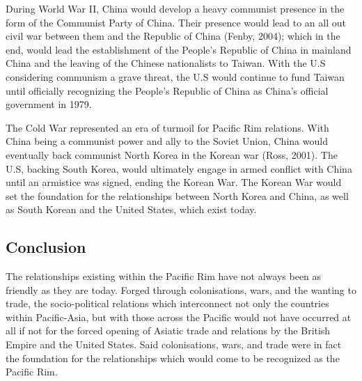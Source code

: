 \documentclass[man,donotrepeattitle,letter]{apa6}
\begin{document}
During World War II, China would develop a heavy communist presence in the form of the Communist Party of China.  Their presence would lead to an all out civil war between them and the Republic of China (Fenby, 2004); which in the end, would lead the establishment of the People's Republic of China in mainland China and the leaving of the Chinese nationalists to Taiwan. With the U.S considering communism a grave threat, the U.S would continue to fund Taiwan until officially recognizing the People's Republic of China as China's official government in 1979.

The Cold War represented an era of turmoil for Pacific Rim relations.  With China being a communist power and ally to the Soviet Union, China would eventually back communist North Korea in the Korean war (Ross, 2001). The U.S, backing South Korea, would ultimately engage in armed conflict with China until an armistice was signed, ending the Korean War. The Korean War would set the foundation for the relationships between North Korea and China, as well as South Korean and the United States, which exist today.

\subsection{Conclusion}
The relationships existing within the Pacific Rim have not always been as friendly as they are today.  Forged through colonisations, wars, and the wanting to trade, the socio-political relations which interconnect not only the countries within Pacific-Asia, but with those across the Pacific would not have occurred at all if not for the forced opening of Asiatic trade and relations by the British Empire and the United States.  Said colonisations, wars, and trade were in fact the foundation for the relationships which would come to be recognized as the Pacific Rim.



\nocite{*}
\printbibliography

\end{document}
